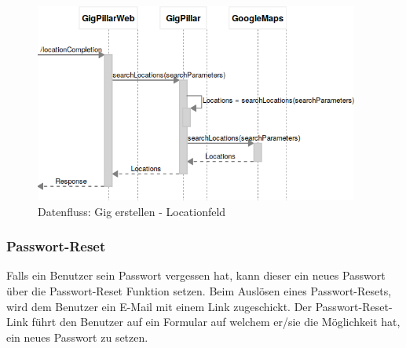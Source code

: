 %

\begin{figure}[!htb]
  \centering
  \includegraphics[width=0.95\textwidth]{konzept/datenfluss-locationfeld.png}
  \caption{Datenfluss: Gig erstellen - Locationfeld}
\end{figure}


\clearpage
\subsubsection{Passwort-Reset}\label{datenfluss-passwort-reset}

Falls ein Benutzer sein Passwort vergessen hat, kann dieser ein neues Passwort
über die Passwort-Reset Funktion setzen. Beim Auslösen eines Passwort-Resets,
wird dem Benutzer ein E-Mail mit einem Link zugeschickt.
Der Passwort-Reset-Link führt den Benutzer auf ein Formular auf welchem er/sie
die Möglichkeit hat, ein neues Passwort zu setzen.

%
%
%


